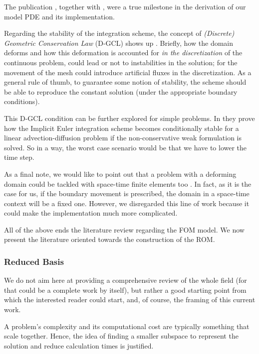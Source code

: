 \documentclass[literature_review.tex]{subfiles}
\begin{document}
The publication \cite{formaggiaALE}, together with \cite{FSIPistonProblem}, 
were a true milestone in the derivation of our model PDE and its implementation.

Regarding the stability of the integration scheme,
the concept of \textit{(Discrete) Geometric Conservation Law} (D-GCL) shows up 
\cite{HUGHES2000467,
GUILLARD20001467,
FARHAT2001669,
LESOINNE199671}.
Briefly, how the domain deforms and how this deformation is accounted for
\textit{in the discretization} of the continuous problem,
could lead or not to instabilities in the solution; 
for the movement of the mesh could introduce artificial fluxes in the discretization.
As a general rule of thumb, 
to guarantee some notion of stability,
the scheme should be able to reproduce the constant solution 
(under the appropriate boundary conditions).

This D-GCL condition can be further explored for simple problems.
In \cite{formaggiaALE} they prove how the Implicit Euler integration scheme
becomes conditionally stable for a linear advection-diffusion problem
if the non-conservative weak formulation is solved.
So in a way, the worst case scenario would be that we have to lower the time step.

As a final note, 
we would like to point out that a problem with a deforming domain
could be tackled with \mbox{space-time} finite elements too \cite{TEZDUYAR1992339}.
In fact, as it is the case for us, 
if the boundary movement is prescribed,
the domain in a \mbox{space-time} context will be a fixed one.
However, 
we disregarded this line of work because it could make the implementation much more complicated.

All of the above ends the literature review regarding the FOM model.
We now present the literature oriented towards the construction of the ROM.

\subsubsection{Reduced Basis}
We do not aim here at providing a comprehensive review of the whole field
(for that could be a complete work by itself),
but rather a good starting point from which the interested reader could start,
and, of course, the framing of this current work.

A problem's complexity and its computational cost
are typically something that scale together.
Hence, the idea of finding a smaller subspace to represent
the solution and reduce calculation times is justified.
\end{document}
